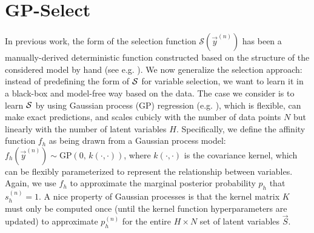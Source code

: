 \section{GP-Select}
%
In previous work, the form of the selection function $\mathcal{S}(\vec{y}^{(n)})$ has been
a manually-derived deterministic function constructed based on the structure of the considered model by hand 
(see e.g. \citep{SheltonEtAl2011, SheltonEtAl2012, DaiLucke2012a, DaiLucke2012b,
BornscheinEtAl2013, SheikhEtAl2014}).
%
We now generalize the selection approach:  %
instead of predefining the form of $\mathcal{S}$ for variable selection, we want
to learn it in a black-box and model-free way based on the data.
%
The case we consider is to learn $\mathcal{S}$ by using Gaussian process (GP) regression
(e.g. \citep{RasmussenGPbook}), which is flexible, can make exact predictions,
and scales cubicly with the number of data points $N$ but linearly with the number of latent variables $H$.  
%
%
%
%
Specifically, we define the affinity function $f_h$ as being drawn from a Gaussian process model: 
$f_h(\vec{y}^{(n)}) \sim \text{GP}\left(0, \, k(\cdot,\cdot) \right)$, where $k(\cdot, \cdot)$ is the covariance kernel, 
which can be flexibly parameterized to represent the relationship between variables.
Again, we use $f_h$ to approximate the marginal posterior probability $p_h$ that $s_h^{(n)}=1$.
%
A nice property of Gaussian processes is that the kernel matrix $K$ must only be computed once (until the kernel function hyperparameters are updated) 
to approximate $p_h^{(n)}$ for the entire $H\times N$ set of latent variables $\vec{S}$.

